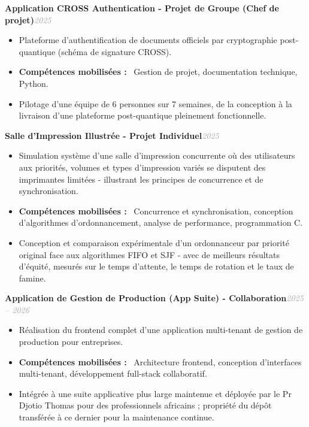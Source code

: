 \documentclass[10pt, a4paper]{article}
\newcommand{\entryhead}[2]{%
  \noindent\textbf{#1}\hfill{\small\textit{\textcolor{darkgray}{#2}}}\\[-4pt]%
}
\newcommand{\blabel}[1]{\textbf{#1}\ }
\begin{document}
\entryhead{Application CROSS Authentication \normalfont\small- Projet de Groupe (Chef de projet)}{2025}
\begin{itemize}
  \item Plateforme d'authentification de documents officiels par cryptographie post-quantique
        (schéma de signature CROSS).
  \item \blabel{Compétences mobilisées :} Gestion de projet, documentation technique, Python.
  \item Pilotage d'une équipe de 6 personnes sur 7 semaines, de la conception à la livraison
        d'une plateforme post-quantique pleinement fonctionnelle.
\end{itemize}

\vspace{4pt}
\entryhead{Salle d'Impression Illustrée \normalfont\small- Projet Individuel}{2025}
\begin{itemize}
  \item Simulation système d'une salle d'impression concurrente où des utilisateurs aux
        priorités, volumes et types d'impression variés se disputent des imprimantes limitées -
        illustrant les principes de concurrence et de synchronisation.
  \item \blabel{Compétences mobilisées :} Concurrence et synchronisation, conception
        d'algorithmes d'ordonnancement, analyse de performance, programmation C.
  \item Conception et comparaison expérimentale d'un ordonnanceur par priorité original face
        aux algorithmes FIFO et SJF - avec de meilleurs résultats d'équité, mesurés sur le
        temps d'attente, le temps de rotation et le taux de famine.
\end{itemize}

\vspace{4pt}
\entryhead{Application de Gestion de Production (App Suite) \normalfont\small- Collaboration}{2025 -- 2026}
\begin{itemize}
  \item Réalisation du frontend complet d'une application multi-tenant de gestion de production
        pour entreprises.
  \item \blabel{Compétences mobilisées :} Architecture frontend, conception d'interfaces
        multi-tenant, développement full-stack collaboratif.
  \item Intégrée à une suite applicative plus large maintenue et déployée par le Pr Djotio
        Thomas pour des professionnels africains ; propriété du dépôt transférée à ce dernier
        pour la maintenance continue.
\end{itemize}
\end{document}
